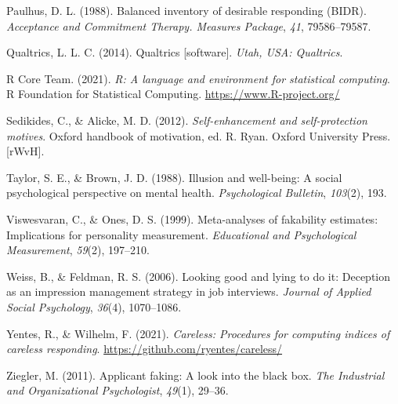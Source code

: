 \documentclass[
  ,jou]{apa6}
\newlength{\cslhangindent}
\newlength{\cslentryspacingunit} %
\newenvironment{CSLReferences}[2] %
 {%
  \setlength{\parindent}{0pt}
  \ifodd #1
  \let\oldpar\par
  \def\par{\hangindent=\cslhangindent\oldpar}
  \fi
  \setlength{\parskip}{#2\cslentryspacingunit}
 }%
 {}
\begin{document}
\begin{CSLReferences}{1}{0}
\leavevmode{}%
Paulhus, D. L. (1988). Balanced inventory of desirable responding ({BIDR}). \emph{Acceptance and Commitment Therapy. Measures Package}, \emph{41}, 79586--79587.

\leavevmode{}%
Qualtrics, L. L. C. (2014). Qualtrics {[}software{]}. \emph{Utah, {USA}: Qualtrics}.

\leavevmode{}%
R Core Team. (2021). \emph{R: A language and environment for statistical computing}. R Foundation for Statistical Computing. \url{https://www.R-project.org/}

\leavevmode{}%
Sedikides, C., \& Alicke, M. D. (2012). \emph{Self-enhancement and self-protection motives}. Oxford handbook of motivation, ed. R. Ryan. Oxford University Press.{[}{rWvH}{]}.

\leavevmode{}%
Taylor, S. E., \& Brown, J. D. (1988). Illusion and well-being: A social psychological perspective on mental health. \emph{Psychological Bulletin}, \emph{103}(2), 193.

\leavevmode{}%
Viswesvaran, C., \& Ones, D. S. (1999). Meta-analyses of fakability estimates: Implications for personality measurement. \emph{Educational and Psychological Measurement}, \emph{59}(2), 197--210.

\leavevmode{}%
Weiss, B., \& Feldman, R. S. (2006). Looking good and lying to do it: Deception as an impression management strategy in job interviews. \emph{Journal of Applied Social Psychology}, \emph{36}(4), 1070--1086.

\leavevmode{}%
Yentes, R., \& Wilhelm, F. (2021). \emph{Careless: Procedures for computing indices of careless responding}. \url{https://github.com/ryentes/careless/}

\leavevmode{}%
Ziegler, M. (2011). Applicant faking: A look into the black box. \emph{The Industrial and Organizational Psychologist}, \emph{49}(1), 29--36.

\end{CSLReferences}

\endgroup
\end{document}
